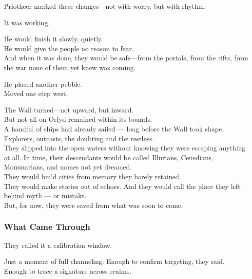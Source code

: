 \documentclass[12pt]{article}
\begin{document}
\vspace{0.5em}
Priotheer marked these changes---not with worry, but with rhythm.

\vspace{0.5em}
It was working.

\vspace{0.5em}
He would finish it slowly, quietly.\\
He would give the people no reason to fear.\\
And when it was done, they would be safe---from the portals, from the rifts, from the war none of them yet knew was coming.

\vspace{0.5em}
He placed another pebble.\\
Moved one step west.

\vspace{0.5em}
The Wall turned---not upward, but inward.\\

But not all on Orfyd remained within its bounds.\\

A handful of ships had already sailed — long before the Wall took shape.\\

Explorers, outcasts, the doubting and the restless.\\

They slipped into the open waters without knowing they were escaping anything at all.
In time, their descendants would be called Illurians, Cenedians, Monunarians, and names not yet dreamed.\\

They would build cities from memory they barely retained.\\

They would make stories out of echoes.
And they would call the place they left behind myth — or mistake.\\

But, for now, they were saved from what was soon to come.

\dotfill

\subsubsection*{What Came Through}

They called it a calibration window.

\vspace{0.5em}
Just a moment of full channeling. Enough to confirm targeting, they said. Enough to trace a signature across realms.
\end{document}
